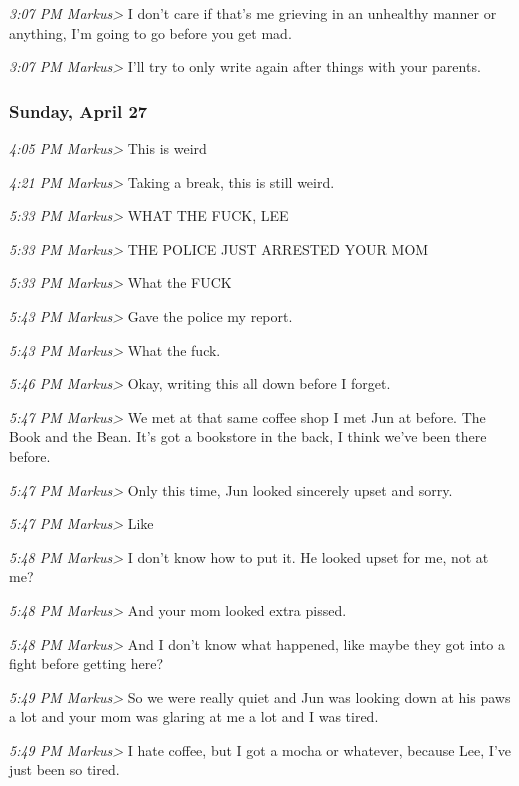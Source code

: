 {\emph{3:07 PM Markus\textgreater{}} I don't care if that's me grieving
in an unhealthy manner or anything, I'm going to go before you get mad.

\emph{3:07 PM Markus\textgreater{}} I'll try to only write again after
things with your parents.

\subsubsection*{Sunday, April 27}\label{sunday-april-27}

\emph{4:05 PM Markus\textgreater{}} This is weird

\emph{4:21 PM Markus\textgreater{}} Taking a break, this is still weird.

\emph{5:33 PM Markus\textgreater{}} WHAT THE FUCK, LEE

\emph{5:33 PM Markus\textgreater{}} THE POLICE JUST ARRESTED YOUR MOM

\emph{5:33 PM Markus\textgreater{}} What the FUCK

\emph{5:43 PM Markus\textgreater{}} Gave the police my report.

\emph{5:43 PM Markus\textgreater{}} What the fuck.

\emph{5:46 PM Markus\textgreater{}} Okay, writing this all down before I
forget.

\emph{5:47 PM Markus\textgreater{}} We met at that same coffee shop I
met Jun at before. The Book and the Bean. It's got a bookstore in the
back, I think we've been there before.

\emph{5:47 PM Markus\textgreater{}} Only this time, Jun looked sincerely
upset and sorry.

\emph{5:47 PM Markus\textgreater{}} Like

\emph{5:48 PM Markus\textgreater{}} I don't know how to put it. He
looked upset for me, not at me?

\emph{5:48 PM Markus\textgreater{}} And your mom looked extra pissed.

\emph{5:48 PM Markus\textgreater{}} And I don't know what happened, like
maybe they got into a fight before getting here?

\emph{5:49 PM Markus\textgreater{}} So we were really quiet and Jun was
looking down at his paws a lot and your mom was glaring at me a lot and
I was tired.

\emph{5:49 PM Markus\textgreater{}} I hate coffee, but I got a mocha or
whatever, because Lee, I've just been so tired.

}
